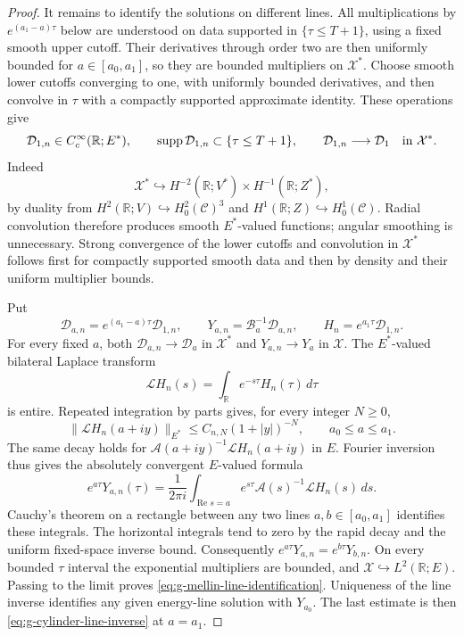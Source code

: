 \documentclass[11pt,a4paper]{article}
\theoremstyle{remark}
\numberwithin{equation}{section}
\begin{document}
\begin{proof}
It remains to identify the solutions on different lines. All
multiplications by $e^{(a_1-a)\tau}$ below are understood on data
supported in $\{\tau\le T+1\}$, using a fixed smooth upper cutoff.
Their derivatives through order two are then uniformly bounded for
$a\in[a_0,a_1]$, so they are bounded multipliers on $\mathcal X^*$.
Choose smooth lower cutoffs converging to one, with uniformly bounded
derivatives, and then convolve in $\tau$ with a compactly supported
approximate identity. These operations give
\[
 \mathcal D_{1,n}\in C_c^\infty(\mathbb R;E^*),\qquad
 \operatorname{supp}\mathcal D_{1,n}\subset\{\tau\le T+1\},
 \qquad
 \mathcal D_{1,n}\longrightarrow\mathcal D_1
       \quad\hbox{in }\mathcal X^*.
\]
Indeed
\[
 \mathcal X^*\hookrightarrow
 H^{-2}(\mathbb R;V^*)\times H^{-1}(\mathbb R;Z^*),
\]
by duality from
$H^2(\mathbb R;V)\hookrightarrow H^2_0(\mathcal C)^3$
and
$H^1(\mathbb R;Z)\hookrightarrow H^1_0(\mathcal C)$.
Radial convolution therefore produces smooth $E^*$-valued functions;
angular smoothing is unnecessary. Strong convergence of the lower
cutoffs and convolution in $\mathcal X^*$ follows first for compactly
supported smooth data and then by density and their uniform multiplier
bounds.

Put
\[
 \mathcal D_{a,n}=e^{(a_1-a)\tau}\mathcal D_{1,n},\qquad
 Y_{a,n}=\mathcal B_a^{-1}\mathcal D_{a,n},\qquad
 H_n=e^{a_1\tau}\mathcal D_{1,n}.
\]
For every fixed $a$, both $\mathcal D_{a,n}\to\mathcal D_a$ in
$\mathcal X^*$ and $Y_{a,n}\to Y_a$ in $\mathcal X$.
The $E^*$-valued bilateral Laplace transform
\[
 \mathcal L H_n(s)=\int_{\mathbb R}e^{-s\tau}H_n(\tau)\,d\tau
\]
is entire. Repeated integration by parts gives, for every integer
$N\ge0$,
\[
 \|\mathcal L H_n(a+iy)\|_{E^*}
 \le C_{n,N}(1+|y|)^{-N},
 \qquad a_0\le a\le a_1.
\]
The same decay holds for
$\mathcal A(a+iy)^{-1}\mathcal L H_n(a+iy)$ in $E$.
Fourier inversion thus gives the absolutely convergent $E$-valued
formula
\[
 e^{a\tau}Y_{a,n}(\tau)=
 \frac1{2\pi i}\int_{\operatorname{Re}s=a}
 e^{s\tau}\mathcal A(s)^{-1}\mathcal L H_n(s)\,ds .
\]
Cauchy's theorem on a rectangle between any two lines
$a,b\in[a_0,a_1]$ identifies these integrals. The horizontal integrals
tend to zero by the rapid decay and the uniform fixed-space inverse
bound. Consequently
$e^{a\tau}Y_{a,n}=e^{b\tau}Y_{b,n}$.
On every bounded $\tau$ interval the exponential multipliers are
bounded, and $\mathcal X\hookrightarrow L^2(\mathbb R;E)$.
Passing to the limit proves \eqref{eq:g-mellin-line-identification}.
Uniqueness of the line inverse identifies any given energy-line
solution with $Y_{a_0}$. The last estimate is then
\eqref{eq:g-cylinder-line-inverse} at $a=a_1$.
\end{proof}
\end{document}
